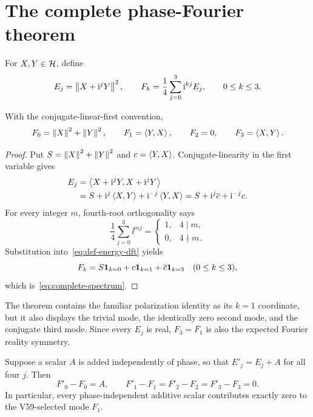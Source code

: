 \section{The complete phase-Fourier theorem}\label{sec:spectrum}

For $X,Y\in\mathcal{H}$, define
\begin{equation}\label{eq:def-energy-dft}
 E_{j}=\left\lVert X+\mathrm{i}^jY\right\rVert^2,
 \qquad
 F_{k}=\frac14\sum_{j=0}^3\mathrm{i}^{kj}E_{j},
 \qquad 0\leq k\leq3.
\end{equation}

\begin{theorem}\label{thm:spectrum}
With the conjugate-linear-first convention,
\begin{equation}\label{eq:complete-spectrum}
 F_{0}=\left\lVert X\right\rVert^2+\left\lVert Y\right\rVert^2,
 \qquad F_{1}=\left\langle Y,X\right\rangle,
 \qquad F_{2}=0,
 \qquad F_{3}=\left\langle X,Y\right\rangle.
\end{equation}
\end{theorem}

\begin{proof}
Put $S=\left\lVert X\right\rVert^2+\left\lVert Y\right\rVert^2$ and $c=\left\langle Y,X\right\rangle$.  Conjugate-linearity in the
first variable gives
\begin{align*}
 E_{j}
 &=\left\langle X+\mathrm{i}^jY,X+\mathrm{i}^jY\right\rangle\\
 &=S+\mathrm{i}^j\left\langle X,Y\right\rangle+\mathrm{i}^{-j}\left\langle Y,X\right\rangle
  =S+\mathrm{i}^j\overline c+\mathrm{i}^{-j}c.
\end{align*}
For every integer $m$, fourth-root orthogonality says
\begin{equation}\label{eq:root-filter}
 \frac14\sum_{j=0}^3\ii^{mj}
 =\begin{cases}1,&4\mid m,\\0,&4\nmid m.\end{cases}
\end{equation}
Substitution into~\eqref{eq:def-energy-dft} yields
\[
 F_{k}=S\mathbf1_{k=0}+c\mathbf1_{k=1}
              +\overline c\mathbf1_{k=3}
 \quad (0\leq k\leq3),
\]
which is~\eqref{eq:complete-spectrum}.
\end{proof}

The theorem contains the familiar polarization identity as its $k=1$
coordinate, but it also displays the trivial mode, the identically zero
second mode, and the conjugate third mode.  Since every $E_j$ is real,
$F_3=\overline{F_1}$ is also the expected Fourier reality symmetry.

\begin{corollary}\label{cor:offset}
Suppose a scalar $A$ is added independently of phase, so that
$E'_j=E_j+A$ for all four $j$.  Then
\[
 F'_0-F_0=A,
 \qquad
 F'_1-F_1=F'_2-F_2=F'_3-F_3=0.
\]
In particular, every phase-independent additive scalar contributes exactly
zero to the V59-selected mode $F_1$.
\end{corollary}

